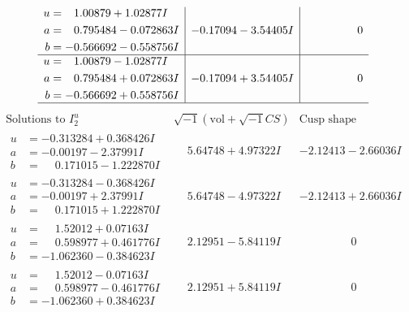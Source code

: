 \documentclass[1p]{elsarticle_modified}
\theoremstyle{definition}
\newcommand{\I}{\sqrt{-1}}
\begin{document}
$$\begin{array}{c|c|c}
\begin{aligned}
u &= \phantom{-}1.00879 + 1.02877 I \\
a &= \phantom{-}0.795484 - 0.072863 I \\
b &= -0.566692 - 0.558756 I\end{aligned}
 & -0.17094 - 3.54405 I & \phantom{-0.000000 } 0 \\ \hline\begin{aligned}
u &= \phantom{-}1.00879 - 1.02877 I \\
a &= \phantom{-}0.795484 + 0.072863 I \\
b &= -0.566692 + 0.558756 I\end{aligned}
 & -0.17094 + 3.54405 I & \phantom{-0.000000 } 0\\
 \hline 
 \end{array}$$\newpage$$\begin{array}{c|c|c}  
\text{Solutions to }I^u_{2}& \I (\text{vol} + \sqrt{-1}CS) & \text{Cusp shape}\\
 \hline 
\begin{aligned}
u &= -0.313284 + 0.368426 I \\
a &= -0.00197 - 2.37991 I \\
b &= \phantom{-}0.171015 - 1.222870 I\end{aligned}
 & \phantom{-}5.64748 + 4.97322 I & -2.12413 - 2.66036 I \\ \hline\begin{aligned}
u &= -0.313284 - 0.368426 I \\
a &= -0.00197 + 2.37991 I \\
b &= \phantom{-}0.171015 + 1.222870 I\end{aligned}
 & \phantom{-}5.64748 - 4.97322 I & -2.12413 + 2.66036 I \\ \hline\begin{aligned}
u &= \phantom{-}1.52012 + 0.07163 I \\
a &= \phantom{-}0.598977 + 0.461776 I \\
b &= -1.062360 - 0.384623 I\end{aligned}
 & \phantom{-}2.12951 - 5.84119 I & \phantom{-0.000000 } 0 \\ \hline\begin{aligned}
u &= \phantom{-}1.52012 - 0.07163 I \\
a &= \phantom{-}0.598977 - 0.461776 I \\
b &= -1.062360 + 0.384623 I\end{aligned}
 & \phantom{-}2.12951 + 5.84119 I & \phantom{-0.000000 } 0 \\ \hline\begin{aligned}

\end{aligned}
\end{array}$$
\end{document}
